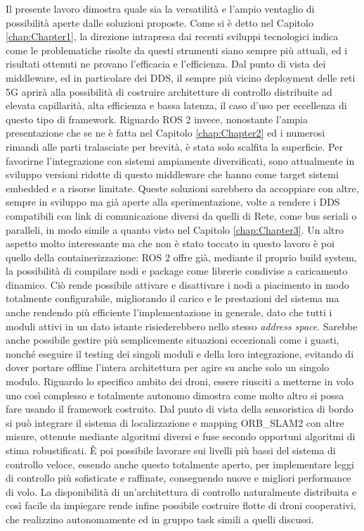 \indent Il presente lavoro dimostra quale sia la versatilità e l'ampio ventaglio di possibilità aperte dalle soluzioni proposte. Come si è detto nel Capitolo \ref{chap:Chapter1}, la direzione intrapresa dai recenti sviluppi tecnologici indica come le problematiche risolte da questi strumenti siano sempre più attuali, ed i risultati ottenuti ne provano l'efficacia e l'efficienza. Dal punto di vista dei middleware, ed in particolare dei DDS, il sempre più vicino deployment delle reti 5G aprirà alla possibilità di costruire architetture di controllo distribuite ad elevata capillarità, alta efficienza e bassa latenza, il caso d'uso per eccellenza di questo tipo di framework. Riguardo ROS 2 invece, nonostante l'ampia presentazione che se ne è fatta nel Capitolo \ref{chap:Chapter2} ed i numerosi rimandi alle parti tralasciate per brevità, è stata solo scalfita la superficie. Per favorirne l'integrazione con sistemi ampiamente diversificati, sono attualmente in sviluppo versioni ridotte di questo middleware che hanno come target sistemi embedded e a risorse limitate. Queste soluzioni sarebbero da accoppiare con altre, sempre in sviluppo ma già aperte alla sperimentazione, volte a rendere i DDS compatibili con link di comunicazione diversi da quelli di Rete, come bus seriali o paralleli, in modo simile a quanto visto nel Capitolo \ref{chap:Chapter3}. Un altro aspetto molto interessante ma che non è stato toccato in questo lavoro è poi quello della containerizzazione: ROS 2 offre già, mediante il proprio build system, la possibilità di compilare nodi e package come librerie condivise a caricamento dinamico. Ciò rende possibile attivare e disattivare i nodi a piacimento in modo totalmente configurabile, migliorando il carico e le prestazioni del sistema ma anche rendendo più efficiente l'implementazione in generale, dato che tutti i moduli attivi in un dato istante risiederebbero nello stesso \emph{address space}. Sarebbe anche possibile gestire più semplicemente situazioni eccezionali come i guasti, nonché eseguire il testing dei singoli moduli e della loro integrazione, evitando di dover portare offline l'intera architettura per agire su anche solo un singolo modulo.
Riguardo lo specifico ambito dei droni, essere riusciti a metterne in volo uno così complesso e totalmente autonomo dimostra come molto altro si possa fare usando il framework costruito. Dal punto di vista della sensoristica di bordo si può integrare il sistema di localizzazione e mapping ORB\_SLAM2 con altre misure, ottenute mediante algoritmi diversi e fuse secondo opportuni algoritmi di stima robustificati. È poi possibile lavorare sui livelli più bassi del sistema di controllo veloce, essendo anche questo totalmente aperto, per implementare leggi di controllo più sofisticate e raffinate, conseguendo nuove e migliori performance di volo. La disponibilità di un'architettura di controllo naturalmente distribuita e così facile da impiegare rende infine possibile costruire flotte di droni cooperativi, che realizzino autonomamente ed in gruppo task simili a quelli discussi.
